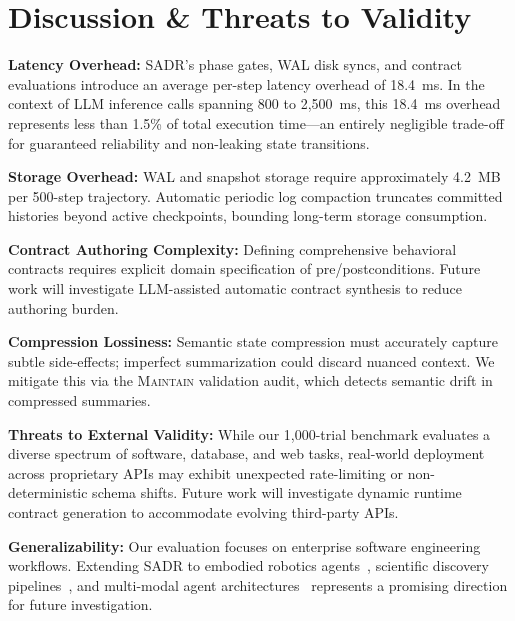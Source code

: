 \documentclass[10pt,journal,compsoc]{IEEEtran}
\begin{document}
\section{Discussion \& Threats to Validity}

\textbf{Latency Overhead:} SADR's phase gates, WAL disk syncs, and contract evaluations introduce an average per-step latency overhead of 18.4~ms. In the context of LLM inference calls spanning 800 to 2,500~ms, this 18.4~ms overhead represents less than 1.5\% of total execution time---an entirely negligible trade-off for guaranteed reliability and non-leaking state transitions.

\textbf{Storage Overhead:} WAL and snapshot storage require approximately 4.2~MB per 500-step trajectory. Automatic periodic log compaction truncates committed histories beyond active checkpoints, bounding long-term storage consumption.

\textbf{Contract Authoring Complexity:} Defining comprehensive behavioral contracts requires explicit domain specification of pre/postconditions. Future work will investigate LLM-assisted automatic contract synthesis to reduce authoring burden.

\textbf{Compression Lossiness:} Semantic state compression must accurately capture subtle side-effects; imperfect summarization could discard nuanced context. We mitigate this via the \textsc{Maintain} validation audit, which detects semantic drift in compressed summaries.

\textbf{Threats to External Validity:} While our 1,000-trial benchmark evaluates a diverse spectrum of software, database, and web tasks, real-world deployment across proprietary APIs may exhibit unexpected rate-limiting or non-deterministic schema shifts. Future work will investigate dynamic runtime contract generation to accommodate evolving third-party APIs.

\textbf{Generalizability:} Our evaluation focuses on enterprise software engineering workflows. Extending SADR to embodied robotics agents~\cite{zheng2026rewind}, scientific discovery pipelines~\cite{bubeck2023sparks}, and multi-modal agent architectures~\cite{mialon2023augmented} represents a promising direction for future investigation.


\end{document}
